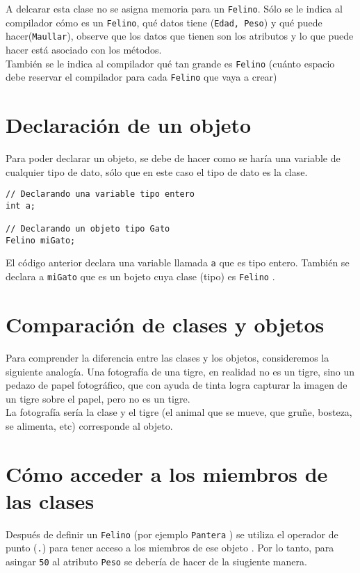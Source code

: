 \documentclass[12pt]{extarticle}
\newcommand{\<}{\langle}
\renewcommand{\>}{\rangle}
\theoremstyle{definition}
\begin{document}
A delcarar esta clase no se asigna memoria para un \verb|Felino|. Sólo se le indica al compilador cómo es un \verb|Felino|, qué datos tiene (\verb|Edad, Peso|) y qué puede hacer(\verb|Maullar|), observe que los datos que tienen son los atributos y lo que puede hacer está asociado con los métodos. \\

También se le indica al compilador qué tan grande es \verb|Felino| (cuánto espacio debe reservar el compilador para cada \verb|Felino|  que vaya a crear)

\section{Declaración de un objeto}
Para poder declarar un objeto, se debe de hacer como se haría una variable de cualquier tipo de dato, sólo que en este caso el tipo de dato es la clase.

\begin{lstlisting}[caption={Declaración de un objeto},captionpos=b]
// Declarando una variable tipo entero
int a;

// Declarando un objeto tipo Gato
Felino miGato;
\end{lstlisting}


El código anterior declara una variable llamada \verb|a| que es tipo entero. También se declara a \verb|miGato| que es un bojeto cuya clase (tipo) es \verb|Felino| . 


\section{Comparación de clases y objetos}

Para comprender la diferencia entre las clases y los objetos, consideremos la siguiente analogía. Una fotografía de una tigre, en realidad no es un tigre, sino un pedazo de papel fotográfico, que con ayuda de tinta logra capturar la imagen de un tigre sobre el papel, pero no es un tigre.\\

La fotografía sería la clase y el tigre (el animal que se mueve, que gruñe, bosteza, se alimenta, etc) corresponde al objeto. 



\section{Cómo acceder a los miembros de las clases}
Después de definir un \verb|Felino| (por ejemplo \verb|Pantera| ) se utiliza el operador de punto (\verb|.|) para tener acceso a los miembros de ese objeto . Por lo tanto, para asingar \verb|50| al atributo \verb|Peso| se debería de hacer de la siugiente manera.\\ 
\end{document}
